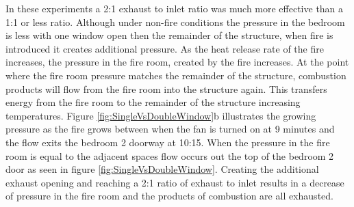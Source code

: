 \documentclass{article}
\begin{document}
In these experiments a 2:1 exhaust to inlet ratio was much more effective than a 1:1 or less ratio. Although under non-fire conditions the pressure in the bedroom is less with one window open then the remainder of the structure, when fire is introduced it creates additional pressure. As the heat release rate of the fire increases, the pressure in the fire room, created by the fire increases. At the point where the fire room pressure matches the remainder of the structure, combustion products will flow from the fire room into the structure again. This transfers energy from the fire room to the remainder of the structure increasing temperatures. Figure \ref{fig:SingleVsDoubleWindow}b illustrates the growing pressure as the fire grows between when the fan is turned on at 9 minutes and the flow exits the bedroom 2 doorway at 10:15. When the pressure in the fire room is equal to the adjacent spaces flow occurs out the top of the bedroom 2 door as seen in  figure \ref{fig:SingleVsDoubleWindow}. Creating the additional exhaust opening and reaching a 2:1 ratio of exhaust to inlet results in a decrease of pressure in the fire room and the products of combustion are all exhausted.
\end{document}
